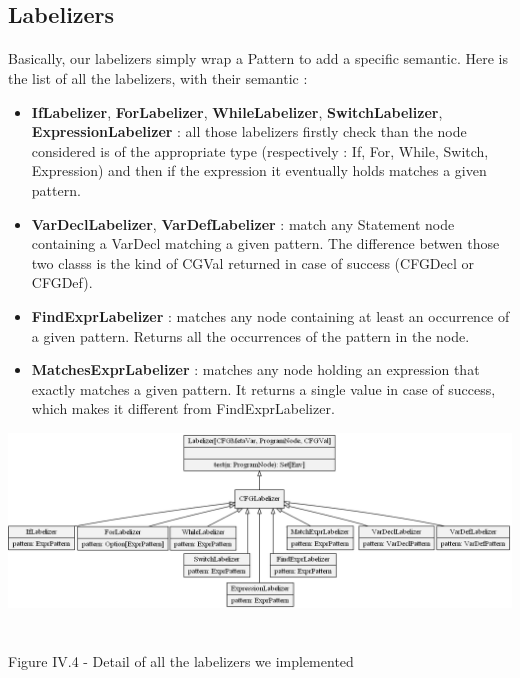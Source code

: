 \documentclass{report}
\begin{document}
\subsection{Labelizers}

\paragraph{}
\hspace{4mm}Basically, our labelizers simply wrap a Pattern to add a specific semantic. Here is the list of all the labelizers, with their semantic :

\vspace{1.5mm}
\begin{itemize}
\item \textbf{IfLabelizer}, \textbf{ForLabelizer}, \textbf{WhileLabelizer}, \textbf{SwitchLabelizer}, \textbf{ExpressionLabelizer} :
all those labelizers firstly check than the node considered is of the appropriate type (respectively : If, For, While, Switch, Expression) and then if the expression
it eventually holds matches a given pattern.\vspace{1mm}
\item \textbf{VarDeclLabelizer}, \textbf{VarDefLabelizer} : match any Statement node containing a VarDecl matching a given pattern. The difference betwen those two classs is the kind of CGVal returned
in case of success (CFGDecl or CFGDef).\vspace{1mm}
\item \textbf{FindExprLabelizer} : matches any node containing at least an occurrence of a given pattern. Returns all the occurrences of the pattern in the node.\vspace{1mm}
\item \textbf{MatchesExprLabelizer} : matches any node holding an expression that exactly matches a given pattern. It returns a single value in case of success, which makes it different from FindExprLabelizer.\vspace{1mm}
\end{itemize}

\begin{center}
\includegraphics[scale=0.55]{data/labels.png}
~\\~\\Figure IV.4 - Detail of all the labelizers we implemented
\end{center}
\end{document}
